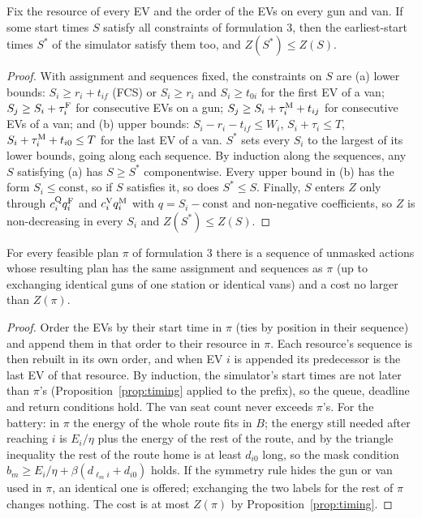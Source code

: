 \begin{proposition}\label{prop:timing}
Fix the resource of every EV and the order of the EVs on every gun and van. If some start times $S$ satisfy all constraints of formulation 3, then the earliest-start times $S^{*}$ of the simulator satisfy them too, and $Z(S^{*})\le Z(S)$.
\end{proposition}
\begin{proof}
With assignment and sequences fixed, the constraints on $S$ are (a) lower bounds: $S_i\ge r_i+t_{if}$ (FCS) or $S_i\ge r_i$ and $S_i\ge t_{0i}$ for the first EV of a van; $S_j\ge S_i+\tau^{\mathrm{F}}_i$ for consecutive EVs on a gun; $S_j\ge S_i+\tau^{\mathrm{M}}_i+t_{ij}$ for consecutive EVs of a van; and (b) upper bounds: $S_i-r_i-t_{if}\le W_i$, $S_i+\tau_i\le T$, $S_i+\tau^{\mathrm{M}}_i+t_{i0}\le T$ for the last EV of a van. $S^{*}$ sets every $S_i$ to the largest of its lower bounds, going along each sequence. By induction along the sequences, any $S$ satisfying (a) has $S\ge S^{*}$ componentwise. Every upper bound in (b) has the form $S_i\le\text{const}$, so if $S$ satisfies it, so does $S^{*}\le S$. Finally, $S$ enters $Z$ only through $c^{\mathrm Q}_iq^{\mathrm{F}}_i$ and $c^{\mathrm V}_iq^{\mathrm{M}}_i$ with $q=S_i-\text{const}$ and non-negative coefficients, so $Z$ is non-decreasing in every $S_i$ and $Z(S^{*})\le Z(S)$.
\end{proof}

\begin{proposition}\label{prop:complete}
For every feasible plan $\pi$ of formulation 3 there is a sequence of unmasked actions whose resulting plan has the same assignment and sequences as $\pi$ (up to exchanging identical guns of one station or identical vans) and a cost no larger than $Z(\pi)$.
\end{proposition}
\begin{proof}
Order the EVs by their start time in $\pi$ (ties by position in their sequence) and append them in that order to their resource in $\pi$. Each resource's sequence is then rebuilt in its own order, and when EV $i$ is appended its predecessor is the last EV of that resource. By induction, the simulator's start times are not later than $\pi$'s (Proposition~\ref{prop:timing} applied to the prefix), so the queue, deadline and return conditions hold. The van seat count never exceeds $\pi$'s. For the battery: in $\pi$ the energy of the whole route fits in $B$; the energy still needed after reaching $i$ is $E_i/\eta$ plus the energy of the rest of the route, and by the triangle inequality the rest of the route home is at least $d_{i0}$ long, so the mask condition $b_m\ge E_i/\eta+\beta(d_{\ell_m i}+d_{i0})$ holds. If the symmetry rule hides the gun or van used in $\pi$, an identical one is offered; exchanging the two labels for the rest of $\pi$ changes nothing. The cost is at most $Z(\pi)$ by Proposition~\ref{prop:timing}.
\end{proof}

